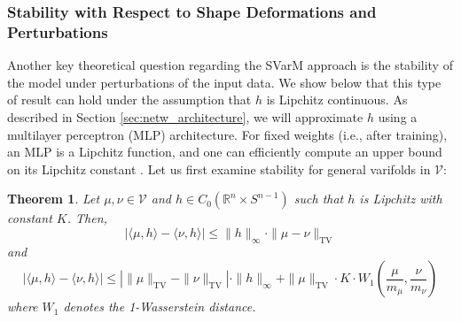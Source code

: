 \documentclass[11pt]{article}
\newtheorem{thm}{Theorem}
\newcommand{\R}{\mathbb{R}}
\begin{document}
\subsubsection{Stability with Respect to Shape Deformations and Perturbations}
Another key theoretical question regarding the SVarM approach is the stability of the model under perturbations of the input data. We show below that this type of result can hold under the assumption that $h$ is Lipchitz continuous. As described in Section \ref{sec:netw_architecture}, we will approximate $h$ using a multilayer perceptron (MLP) architecture. For fixed weights (i.e., after training), an MLP is a Lipchitz function, and one can efficiently compute an upper bound on its Lipchitz constant \cite{NEURIPS2018_d54e99a6}. Let us first examine stability for general varifolds in $\mathcal{V}$:
\begin{thm}\label{thm:stabilityW1}
    Let $\mu,\nu\in\mathcal{V}$ and $h\in C_0(\R^n\times S^{n-1})$ such that $h$ is Lipchitz with constant $K$. Then, 
    \begin{equation*}
       |\langle\mu,h\rangle - \langle\nu,h\rangle|\leq\|h\|_\infty\cdot \|\mu-\nu\|_{\text{TV}}
    \end{equation*}
    and
    \begin{equation*}
        |\langle\mu,h\rangle - \langle\nu,h\rangle|\leq \left|\|\mu\|_{\text{TV}}-\|\nu\|_{\text{TV}}\right|\cdot\|h\|_\infty + \|\mu\|_{\text{TV}}\cdot K\cdot W_1\left(\frac{\mu}{m_\mu},\frac{\nu}{m_\nu}\right)
    \end{equation*}
    where $W_1$ denotes the 1-Wasserstein distance. 
\end{thm}
\end{document}
